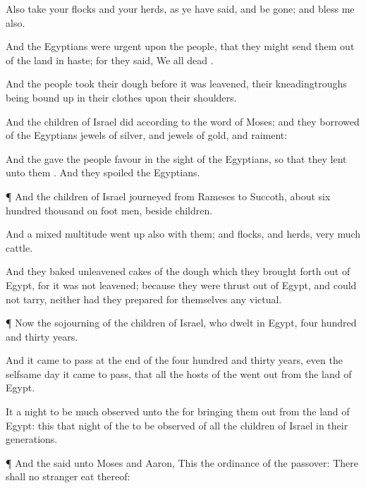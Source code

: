 {Also
take your
flocks and your
herds, as ye have
said, and be
gone; and
bless me also.

And the
Egyptians were
urgent upon the
people, that they might
send them out of the
land in
haste; for they
said, We
{} all
dead
{}.

And the
people
took their
dough before it was
leavened, their
kneadingtroughs being bound
up in their
clothes upon their
shoulders.

And the
children of
Israel
did according to the
word of
Moses; and they
borrowed of the
Egyptians
jewels of
silver, and
jewels of
gold, and
raiment:

And the
{}
gave the
people
favour in the
sight of the
Egyptians, so that they
lent unto them
{}. And they
spoiled the
Egyptians.


\par }{\PP {}¶ And the
children of
Israel
journeyed from
Rameses to
Succoth, about
six
hundred
thousand on
foot
{}
men,
beside
children.

And a
mixed
multitude went
up also with them; and
flocks, and
herds,
{}
very
much
cattle.

And they
baked
unleavened
cakes of the
dough which they brought
forth out of
Egypt, for it was not
leavened; because they were thrust
out of
Egypt, and
could not
tarry, neither had they
prepared for themselves any
victual.


\par }{\PP {}¶ Now the
sojourning of the
children of
Israel, who
dwelt in
Egypt,
{}
four
hundred and
thirty
years.

And it came to pass at the
end of the
four
hundred and
thirty
years, even the
selfsame
day it came to pass, that all the
hosts of the
{} went
out from the
land of
Egypt.

It
{} a
night to be much
observed unto the
{} for
bringing them out from the
land of
Egypt: this
{} that
night of the
{} to be
observed of all the
children of
Israel in their
generations.


\par }{\PP {}¶ And the
{}
said unto
Moses and
Aaron, This
{} the
ordinance of the
passover: There shall no
stranger
eat thereof:

}

